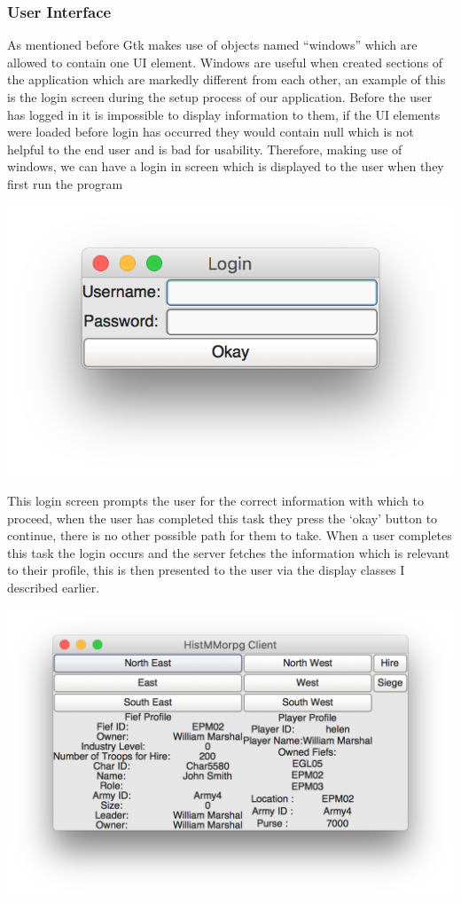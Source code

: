 \documentclass{article}
\begin{document}
\subsubsection{User Interface}

As mentioned before Gtk makes use of objects named “windows” which are allowed to contain one UI element. Windows are useful when created sections of the application which are markedly different from each other, an example of this is the login screen during the setup process of our application. Before the user has logged in it is impossible to display information to them, if the UI elements were loaded before login has occurred they would contain null which is not helpful to the end user and is bad for usability. Therefore, making use of windows, we can have a login in screen which is displayed to the user when they first run the program 
\begin{center}
\includegraphics[scale=1]{gtk1.png}
\end{center}
This login screen prompts the user for the correct information with which to proceed, when the user has completed this task they press the ‘okay’ button to continue, there is no other possible path for them to take. When a user completes this task the login occurs and the server fetches the information which is relevant to their profile, this is then presented to the user via the display classes I described earlier.
\begin{center}
	\includegraphics[scale=.8]{gtk2.png}
\end{center}
\end{document}
